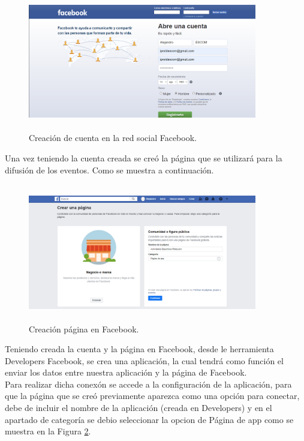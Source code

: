 	\begin{figure}[hbt!]
		\centering
		\includegraphics[width=10cm, height=6cm]{Imagenes/CreacionCuentaFB/CreacionCuentaFB}
		\caption{Creación de cuenta en la red social Facebook.}
		\label{creacioncuentafb}
	\end{figure}
	\pagebreak
	
	\noindent Una vez teniendo la cuenta creada se creó la página que se utilizará para la difusión de los eventos. Como se muestra a continuación.
	
	\begin{figure}[hbt!]
		\centering
		\includegraphics[width=10cm, height=6cm]{Imagenes/CreacionCuentaFB/CreacionPagina}
		\caption{Creación página en Facebook.}
		\label{creacionpagina}
	\end{figure}
	
	
	\noindent Teniendo creada la cuenta y la página en Facebook, desde le herramienta Developers Facebook, se crea una aplicación, la cual tendrá como función el enviar los datos entre nuestra aplicación y la página de Facebook.\\
	
	\noindent Para realizar dicha conexón se accede a la configuración de la aplicación, para que la página que se creó previamente aparezca como una opción para conectar, debe de incluir el nombre de la aplicación (creada en Developers) y en el apartado de categoría se debio seleccionar la opcion de Página de app como se muestra en la Figura \ref{creacionpagina}.
	
